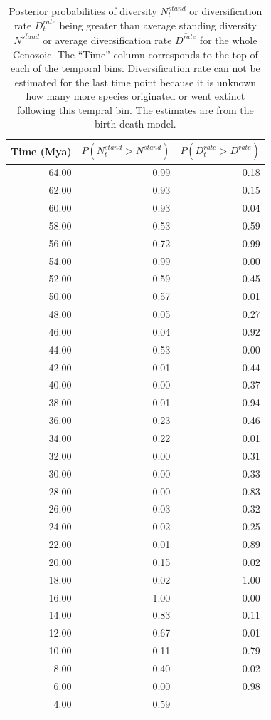 \documentclass[12pt,letterpaper]{article}
\begin{document}
\begin{table}[ht]
  \centering
  \caption[Posterior probability estimates of a peak in diversity, diversification]{Posterior probabilities of diversity \(N^{stand}_{t}\) or diversification rate \(D^{rate}_{t}\) being greater than average standing diversity \(\overline{N^{stand}}\) or average diversification rate \(\overline{D^{rate}}\) for the whole Cenozoic. The ``Time'' column corresponds to the top of each of the temporal bins. Diversification rate can not be estimated for the last time point because it is unknown how many more species originated or went extinct following this tempral bin. The estimates are from the birth-death model.}
  \label{tab:div_peak}
  \begin{tabular}{ r r r }
    \hline
    Time (Mya) & \(P(N^{stand}_{t} > \overline{N^{stand}})\) & \(P(D^{rate}_{t} > \overline{D^{rate}})\) \\ 
    \hline
    64.00 & 0.99 & 0.18 \\ 
    62.00 & 0.93 & 0.15 \\ 
    60.00 & 0.93 & 0.04 \\ 
    58.00 & 0.53 & 0.59 \\ 
    56.00 & 0.72 & 0.99 \\ 
    54.00 & 0.99 & 0.00 \\ 
    52.00 & 0.59 & 0.45 \\ 
    50.00 & 0.57 & 0.01 \\ 
    48.00 & 0.05 & 0.27 \\ 
    46.00 & 0.04 & 0.92 \\ 
    44.00 & 0.53 & 0.00 \\ 
    42.00 & 0.01 & 0.44 \\ 
    40.00 & 0.00 & 0.37 \\ 
    38.00 & 0.01 & 0.94 \\ 
    36.00 & 0.23 & 0.46 \\ 
    34.00 & 0.22 & 0.01 \\ 
    32.00 & 0.00 & 0.31 \\ 
    30.00 & 0.00 & 0.33 \\ 
    28.00 & 0.00 & 0.83 \\ 
    26.00 & 0.03 & 0.32 \\ 
    24.00 & 0.02 & 0.25 \\ 
    22.00 & 0.01 & 0.89 \\ 
    20.00 & 0.15 & 0.02 \\ 
    18.00 & 0.02 & 1.00 \\ 
    16.00 & 1.00 & 0.00 \\ 
    14.00 & 0.83 & 0.11 \\ 
    12.00 & 0.67 & 0.01 \\ 
    10.00 & 0.11 & 0.79 \\ 
    8.00 & 0.40 & 0.02 \\ 
    6.00 & 0.00 & 0.98 \\ 
    4.00 & 0.59 & \\ 
    \hline
  \end{tabular}
\end{table}
\end{document}
